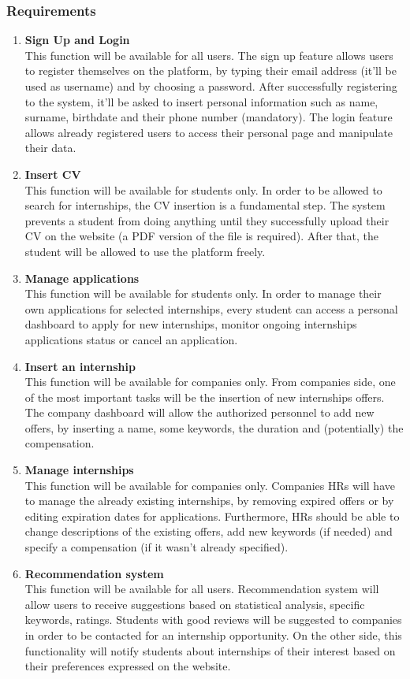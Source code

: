 \documentclass{article}
\begin{document}
\subsubsection{Requirements}
\begin{enumerate}
    \item \textbf{Sign Up and Login}\\
    This function will be available for all users. The sign up feature allows users to register themselves on the platform, by typing their email address (it'll be used as username) and by choosing a password. After successfully registering to the system, it'll be asked to insert personal information such as name, surname, birthdate and their phone number (mandatory). The login feature allows already registered users to access their personal page and manipulate their data.
    \item \textbf{Insert CV}\\
    This function will be available for students only. In order to be allowed to search for internships, the CV insertion is a fundamental step. The system prevents a student from doing anything until they successfully upload their CV on the website (a PDF version of the file is required). After that, the student will be allowed to use the platform freely.
    \item \textbf{Manage applications}\\
    This function will be available for students only. In order to manage their own applications for selected internships, every student can access a personal dashboard to apply for new internships, monitor ongoing internships applications status or cancel an application.
    \item \textbf{Insert an internship}\\
    This function will be available for companies only. From companies side, one of the most important tasks will be the insertion of new internships offers. The company dashboard will allow the authorized personnel to add new offers, by inserting a name, some keywords, the duration and (potentially) the compensation.
    \item \textbf{Manage internships}\\
    This function will be available for companies only. Companies HRs will have to manage the already existing internships, by removing expired offers or by editing expiration dates for applications. Furthermore, HRs should be able to change descriptions of the existing offers, add new keywords (if needed) and specify a compensation (if it wasn't already specified).
    \item \textbf{Recommendation system}\\
    This function will be available for all users. Recommendation system will allow users to receive suggestions based on statistical analysis, specific keywords, ratings. Students with good reviews will be suggested to companies in order to be contacted for an internship opportunity. On the other side, this functionality will notify students about internships of their interest based on their preferences expressed on the website.


\end{enumerate}
\end{document}
